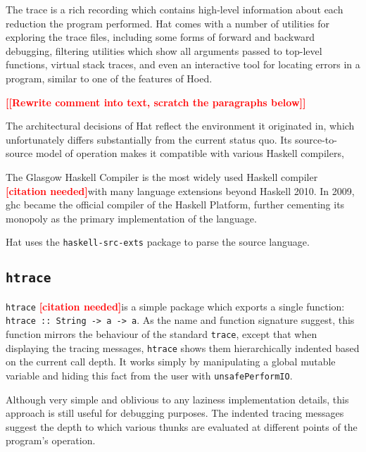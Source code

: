 \documentclass[thesis=B,english]{FITthesis}[2019/12/23]
\newcommand{\todo}[1]{\textcolor{red}{\textbf{[[#1]]}}}
\newcommand{\citationNeeded}{\textcolor{red}{\textbf{[citation needed]}}}
\newcommand{\hackage}[1]{\texttt{#1}}
\newcommand{\hsSignature}[1]{\texttt{#1}}
\newcommand{\hsIdent}[1]{\texttt{#1}}
\begin{document}
The trace is a rich recording which contains high-level information about each
reduction the program performed. Hat comes with a number of utilities for
exploring the trace files, including some forms of forward and backward
debugging, filtering utilities which show all arguments passed to top-level
functions, virtual stack traces, and even an interactive tool for locating
errors in a program, similar to one of the features of Hoed.

\todo{Rewrite comment into text, scratch the paragraphs below}

The architectural decisions of Hat reflect the environment it originated in,
which unfortunately differs substantially from the current status quo. Its
source-to-source model of operation makes it compatible with various Haskell
compilers,


The Glasgow Haskell Compiler is the most widely used Haskell compiler
\citationNeeded with many language extensions beyond Haskell 2010. In 2009,
\acrshort{ghc} became the official compiler of the Haskell
Platform\cite{haskell-platform}, further cementing its monopoly as the primary
implementation of the language.

Hat uses the \hackage{haskell-src-exts} package to parse the source language.


\subsection*{\hackage{htrace}} \label{sec:htrace}
\hackage{htrace} \citationNeeded is a simple package which exports a single
function: \hsSignature{htrace :: String -> a -> a}. As the name and function
signature suggest, this function mirrors the behaviour of the standard
\hsIdent{trace}, except that when displaying the tracing messages,
\hackage{htrace} shows them hierarchically indented based on the current call
depth. It works simply by manipulating a global mutable variable and hiding
this fact from the user with \hsIdent{unsafePerformIO}.

Although very simple and oblivious to any laziness implementation details, this
approach is still useful for debugging purposes. The indented tracing messages
suggest the depth to which various thunks are evaluated at different points of
the program's operation.
\end{document}
